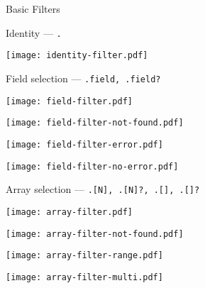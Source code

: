 \documentclass{beamer}
\renewcommand\big[1]{
  \begin{center}
    \Large{#1}
  \end{center}
}
\begin{document}
\begin{frame}
  \centering\Huge{Basic Filters}
\end{frame}

\begin{frame}[fragile]
  \big{Identity --- \texttt{.}}
  \begin{center}
    \texttt{[image: identity-filter.pdf]}
  \end{center}
\end{frame}

\begin{frame}[fragile]
  \big{Field selection --- \texttt{.field, .field?}}
  \begin{center}
    \begin{minipage}{.24\textwidth}
      \texttt{[image: field-filter.pdf]}
    \end{minipage}
    \begin{minipage}{.24\textwidth}
      \texttt{[image: field-filter-not-found.pdf]}
    \end{minipage}
    \begin{minipage}{.24\textwidth}
      \texttt{[image: field-filter-error.pdf]}
    \end{minipage}
    \begin{minipage}{.24\textwidth}
      \texttt{[image: field-filter-no-error.pdf]}
    \end{minipage}
  \end{center}
\end{frame}

\begin{frame}[fragile]
  \big{Array selection --- \texttt{.[N], .[N]?, .[], .[]?}}
  \begin{center}
    \begin{minipage}{.24\textwidth}
      \texttt{[image: array-filter.pdf]}
    \end{minipage}
    \begin{minipage}{.24\textwidth}
      \texttt{[image: array-filter-not-found.pdf]}
    \end{minipage}
    \begin{minipage}{.24\textwidth}
      \texttt{[image: array-filter-range.pdf]}
    \end{minipage}
    \begin{minipage}{.24\textwidth}
      \texttt{[image: array-filter-multi.pdf]}
    \end{minipage}
  \end{center}
\end{frame}
\end{document}
